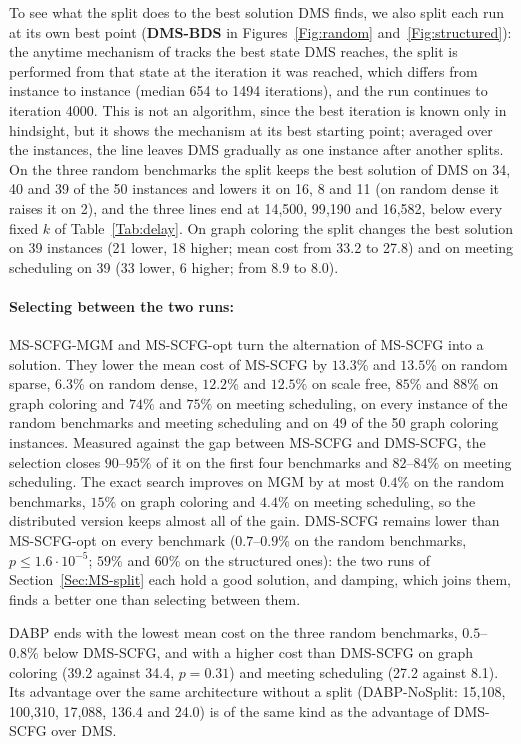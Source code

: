 To see what the split does to the best solution DMS finds, we also split each run at its own best point (\textbf{DMS-BDS} in Figures~\ref{Fig:random} and~\ref{Fig:structured}): the anytime mechanism of \citet{ZivanOP14} tracks the best state DMS reaches, the split is performed from that state at the iteration it was reached, which differs from instance to instance (median 654 to 1494 iterations), and the run continues to iteration 4000. This is not an algorithm, since the best iteration is known only in hindsight, but it shows the mechanism at its best starting point; averaged over the instances, the line leaves DMS gradually as one instance after another splits. On the three random benchmarks the split keeps the best solution of DMS on 34, 40 and 39 of the 50 instances and lowers it on 16, 8 and 11 (on random dense it raises it on 2), and the three lines end at 14{,}500, 99{,}190 and 16{,}582, below every fixed $k$ of Table~\ref{Tab:delay}. On graph coloring the split changes the best solution on 39 instances (21 lower, 18 higher; mean cost from 33.2 to 27.8) and on meeting scheduling on 39 (33 lower, 6 higher; from 8.9 to 8.0).

\paragraph{Selecting between the two runs:}
MS-SCFG-MGM and MS-SCFG-opt turn the alternation of MS-SCFG into a solution. They lower the mean cost of MS-SCFG by $13.3\%$ and $13.5\%$ on random sparse, $6.3\%$ on random dense, $12.2\%$ and $12.5\%$ on scale free, $85\%$ and $88\%$ on graph coloring and $74\%$ and $75\%$ on meeting scheduling, on every instance of the random benchmarks and meeting scheduling and on 49 of the 50 graph coloring instances. Measured against the gap between MS-SCFG and DMS-SCFG, the selection closes $90$--$95\%$ of it on the first four benchmarks and $82$--$84\%$ on meeting scheduling. The exact search improves on MGM by at most $0.4\%$ on the random benchmarks, $15\%$ on graph coloring and $4.4\%$ on meeting scheduling, so the distributed version keeps almost all of the gain. DMS-SCFG remains lower than MS-SCFG-opt on every benchmark ($0.7$--$0.9\%$ on the random benchmarks, $p \le 1.6\cdot 10^{-5}$; $59\%$ and $60\%$ on the structured ones): the two runs of Section~\ref{Sec:MS-split} each hold a good solution, and damping, which joins them, finds a better one than selecting between them.

DABP ends with the lowest mean cost on the three random benchmarks, $0.5$--$0.8\%$ below DMS-SCFG, and with a higher cost than DMS-SCFG on graph coloring (39.2 against 34.4, $p = 0.31$) and meeting scheduling (27.2 against 8.1). %
Its advantage over the same architecture without a split (DABP-NoSplit: 15{,}108, 100{,}310, 17{,}088, 136.4 and 24.0) is of the same kind as the advantage of DMS-SCFG over DMS.

